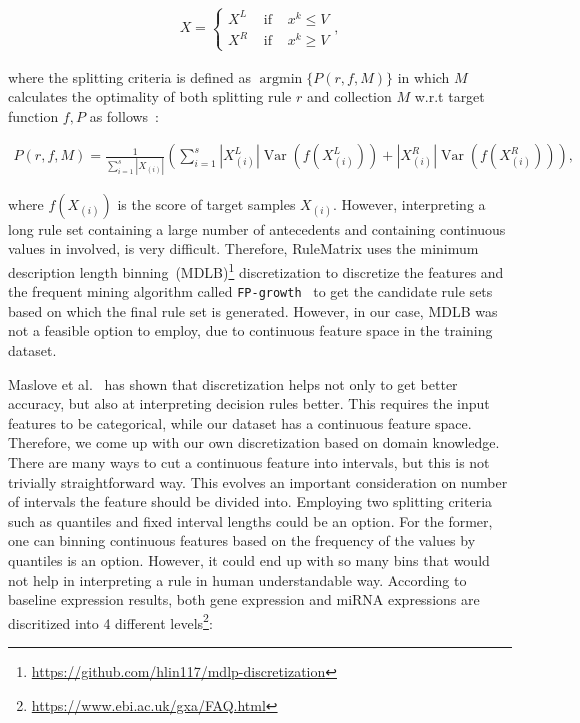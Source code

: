 \vspace{-4mm}
\begin{align}
    X=\left\{\begin{array}{lll}X^{L} & \text { if } & x^{k} \leq V \\ X^{R} & \text { if } & x^{k} \geq V\end{array}\right.,
\end{align}

\hspace*{3.5mm} where the splitting criteria is defined as $\operatorname{argmin}\{P(r, f, M) \}$ in which $M$ calculates the optimality of both splitting rule $r$ and collection $M$ w.r.t target function $f, P$ as follows~\cite{al2021cdrgi}: 

\vspace{-2mm}
\begin{align}
    P(r, f, M)=\frac{1}{\sum_{i=1}^{s}\left|X_{(i)}\right|}\left(\sum_{i=1}^{s}\left|X_{(i)}^{L}\right| \operatorname{Var}\left(f\left(X_{(i)}^{L}\right)\right)+\left|X_{(i)}^{R}\right| \operatorname{Var}\left(f\left(X_{(i)}^{R}\right)\right)\right),
\end{align}

\hspace*{3.5mm} where $f\left(X_{(i)}\right)$ is the score of target samples $X_{(i)}$.  However, interpreting a long rule set containing a large number of antecedents and containing continuous values in involved, is very difficult. Therefore, RuleMatrix uses the minimum description length binning~(MDLB)\footnote{\url{https://github.com/hlin117/mdlp-discretization}} discretization to discretize the features and the frequent mining algorithm called \texttt{FP-growth}~\cite{han2000mining} to get the candidate rule sets based on which the final rule set is generated. However, in our case, MDLB was not a feasible option to employ, due to continuous feature space in the training dataset. 

\hspace*{3.5mm} Maslove et al.~\cite{maslove2013discretization} has shown that discretization helps not only to get better accuracy, but also at interpreting  decision rules better. This requires the input features to be categorical, while our dataset has a continuous feature space. Therefore, we come up with our own discretization based on domain knowledge. There are many ways to cut a continuous feature into intervals, but this is not trivially straightforward way. This evolves an important consideration on number of intervals the feature should be divided into. Employing two splitting criteria such as quantiles and fixed interval lengths could be an option. For the former, one can binning continuous features based on the frequency of the values by quantiles is an option. However, it could end up with so many bins that would not help in interpreting a rule in human understandable way. 
According to baseline expression results, both gene expression and miRNA expressions are discritized into 4 different levels\footnote{\url{https://www.ebi.ac.uk/gxa/FAQ.html}}:

